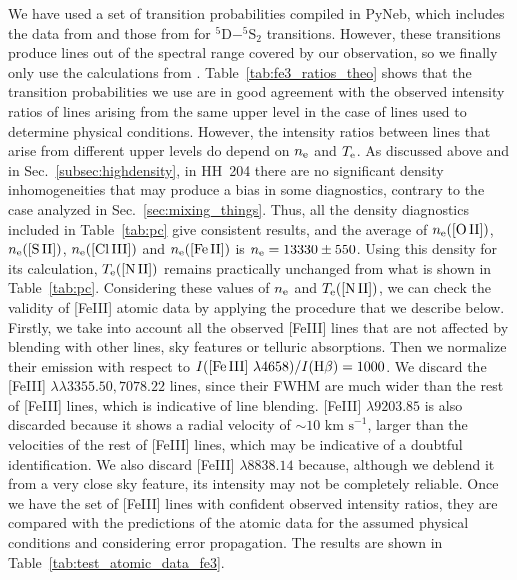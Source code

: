 \documentclass[twocolumn,linenumbers]{aastex63}
\begin{document}
We have used a set of transition probabilities compiled in PyNeb, which includes the data from  \citet[][]{Quinet96} and those from \citet[][]{Johansson00} for $^5\text{D}- ^5\text{S}_2$ transitions. However, these transitions produce lines out of the spectral range covered by our observation, so we finally only use the calculations from \citet[][]{Quinet96}. Table~\ref{tab:fe3_ratios_theo} shows that the transition probabilities we use are in good agreement with the observed intensity ratios of lines arising from the same upper level in the case of lines used to determine physical conditions. However, the intensity ratios between lines that arise from different upper levels do depend on $n_{\rm e}$ and $T_{\rm e}$. As discussed above and in Sec.~\ref{subsec:highdensity}, in HH~204 there are no significant density inhomogeneities that may produce a bias in some diagnostics, contrary to the case analyzed in Sec.~\ref{sec:mixing_things}. Thus, all the density diagnostics included in Table~\ref{tab:pc} give consistent results, and the average of $n_{\rm e}\text{([O\thinspace II])}$, $n_{\rm e}\text{([S\thinspace II])}$, $n_{\rm e}\text{([Cl\thinspace III])}$ and $n_{\rm e}\text{([Fe\thinspace II])}$ is $n_{\rm e}=13330 \pm 550$. Using this density for its calculation, $T_{\rm e}(\text{[N\thinspace II]})$ remains practically unchanged from what is shown in Table~\ref{tab:pc}. Considering these values of $n_{\rm e}$ and $T_{\rm e}(\text{[N\thinspace II]})$, we can check the validity of [Fe\thinspace III] atomic data by applying the procedure that we describe below.  Firstly, we take into account all the observed [Fe\thinspace III] lines that are not affected by blending with other lines, sky features or telluric absorptions. Then we normalize their emission with respect to $I(\text{[Fe\thinspace III] } \lambda 4658)/I(\text{H}\beta)=1000$. We discard the [Fe\thinspace III] $\lambda \lambda 3355.50, 7078.22$ lines, since their FWHM are much wider than the rest of [Fe\thinspace III] lines, which is indicative of line blending. [Fe\thinspace III] $\lambda 9203.85$ is also discarded because it shows a radial velocity of $\sim 10\text{ km s}^{-1}$,  larger than the velocities of the rest of [Fe\thinspace III] lines, which may be indicative of a doubtful identification. We also discard [Fe\thinspace III] $\lambda 8838.14$ because, although we deblend it from a very close sky feature, its intensity may not be completely reliable. Once we have the set of [Fe\thinspace III] lines with confident observed intensity ratios, they are compared with the predictions of the atomic data for the assumed physical conditions and considering error propagation. The results are shown in Table~\ref{tab:test_atomic_data_fe3}.
\end{document}
